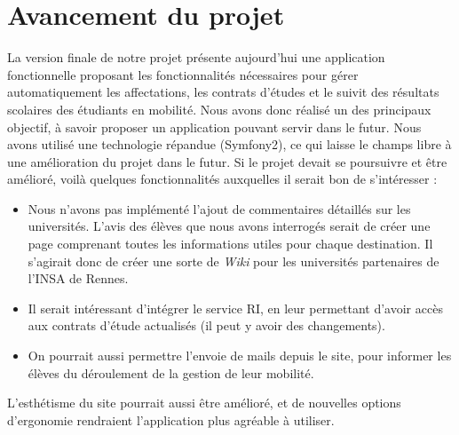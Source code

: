 \chapter{Avancement du projet}

La version finale de notre projet présente aujourd'hui une application fonctionnelle proposant les fonctionnalités nécessaires pour gérer automatiquement les affectations, les contrats d'études et le suivit des résultats scolaires des étudiants en mobilité.
Nous avons donc réalisé un des principaux objectif, à savoir proposer un application pouvant servir dans le futur. Nous avons utilisé une technologie répandue (Symfony2), ce qui laisse le champs libre à une amélioration du projet dans le futur.
\smallbreak
Si le projet devait se poursuivre et être amélioré, voilà quelques fonctionnalités auxquelles il serait bon de s'intéresser :
\begin{itemize}
	\item Nous n'avons pas implémenté l'ajout de commentaires détaillés sur les universités. L'avis des élèves que nous avons interrogés serait de créer une page comprenant toutes les informations utiles pour chaque destination. Il s'agirait donc de créer une sorte de \textit{Wiki} pour les universités partenaires de l'INSA de Rennes.
	\item Il serait intéressant d'intégrer le service RI, en leur permettant d'avoir accès aux contrats d'étude actualisés (il peut y avoir des changements).
	\item On pourrait aussi permettre l'envoie de mails depuis le site, pour informer les élèves du déroulement de la gestion de leur mobilité.
\end{itemize}
\smallbreak
L'esthétisme du site pourrait aussi être amélioré, et de nouvelles options d'ergonomie rendraient l'application plus agréable à utiliser.
